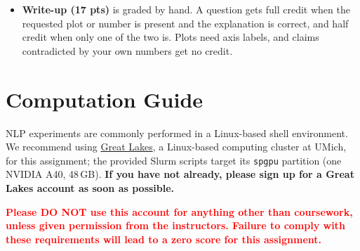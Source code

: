 \documentclass[11pt]{article}
\newcommand{\file}[1]{\texttt{#1}}
\begin{document}
\begin{itemize}
        training script produced; for example, selecting among several samples with the verifier is not allowed.
        Keep your \file{results/*/final} checkpoints on Great Lakes until grades are released: we spot-check
        submissions by re-running the evaluation on them. Edited or substituted predictions are an honor-code
        violation.
  \item \textbf{Write-up (17 pts)} is graded by hand. A question gets full credit when the requested plot or
        number is present and the explanation is correct, and half credit when only one of the two is. Plots need
        axis labels, and claims contradicted by your own numbers get no credit.
\end{itemize}

\section*{Computation Guide}
NLP experiments are commonly performed in a Linux-based shell environment. We recommend using
\href{https://arc.umich.edu/greatlakes/}{Great Lakes}, a Linux-based computing cluster at UMich, for this
assignment; the provided Slurm scripts target its \texttt{spgpu} partition (one NVIDIA A40, 48\,GB).
\textbf{If you have not already, please sign up for a Great Lakes account as soon as possible.}

\noindent\textcolor{red}{\textbf{Please DO NOT use this account for anything other than coursework, unless given
permission from the instructors. Failure to comply with these requirements will lead to a zero score for this
assignment.}}
\end{document}
